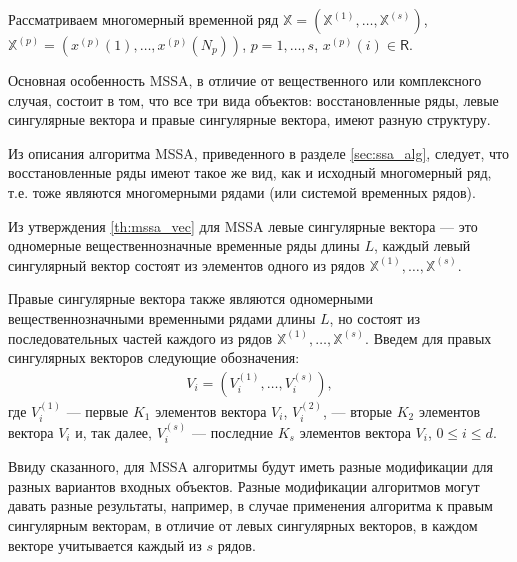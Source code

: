 \documentclass[specialist,
               substylefile = spbu.rtx,
               subf,href,colorlinks=true, 12pt]{disser}
\begin{document}
Рассматриваем многомерный временной ряд $\mathbb{X}= \left(\mathbb{X}^{(1)}, \ldots,\mathbb{X}^{(s)}\right)$,\\ $\mathbb{X}^{(p)}= \left(x^{(p)}(1),\ldots,x^{(p)}(N_p)\right)$, $p=1,\ldots,s$, $x^{(p)}(i) \in \mathsf{R}$. 

Основная особенность MSSA, в отличие от вещественного или комплексного случая, состоит в том, что все три вида объектов: восстановленные ряды, левые сингулярные вектора и правые сингулярные вектора, имеют разную структуру.

Из описания алгоритма MSSA, приведенного в разделе \ref{sec:ssa_alg}, следует, что восстановленные ряды имеют такое же вид, как и исходный многомерный ряд, т.е. тоже являются многомерными рядами (или системой временных рядов). 

Из утверждения \ref{th:mssa_vec} для MSSA левые сингулярные вектора --- это одномерные вещественнозначные временные ряды
 длины $L$, каждый левый сингулярный вектор состоят из элементов одного из рядов $\mathbb{X}^{(1)}, \ldots, \mathbb{X}^{(s)}$. 
 
 Правые сингулярные вектора также являются одномерными вещественнозначными временными рядами длины $L$, но состоят из 
последовательных частей каждого из рядов $\mathbb{X}^{(1)}, \ldots, \mathbb{X}^{(s)}$.
Введем для правых сингулярных векторов следующие обозначения: 
\begin{gather} \label{eq:V_mssa}
{V}_{i} = \left({V}_i^{(1)}, \ldots, {V}_i^{(s)}\right), 
\end{gather}
где $V_i^{(1)}$ --- первые $K_1$ элементов вектора ${V}_{i}$,  $V_i^{(2)}$, --- вторые $K_2$ элементов вектора ${V}_{i}$ и, так далее, $V_i^{(s)}$ --- последние $K_s$ элементов вектора ${V}_{i}$, $0 \leqslant i \leqslant d$. 

Ввиду сказанного, для MSSA алгоритмы будут иметь разные модификации для разных вариантов входных объектов. Разные модификации алгоритмов могут давать разные результаты, например, в случае применения алгоритма к правым сингулярным векторам, в отличие от левых сингулярных векторов, в каждом векторе учитывается каждый из $s$ рядов.  
 
\end{document}
